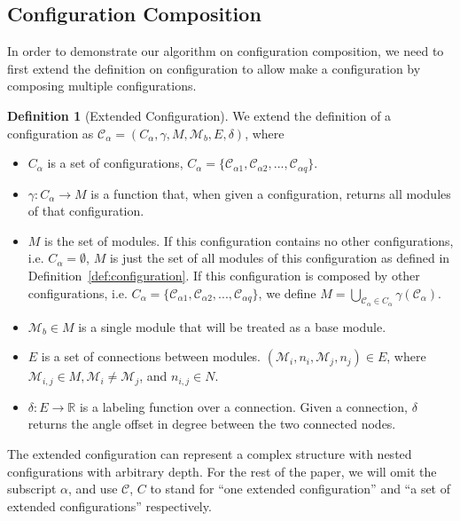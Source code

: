 \documentclass[conference]{IEEEtran}
\theoremstyle{definition}
\newtheorem{definition}{Definition}[section]
\begin{document}
\subsection{Configuration Composition} \label{sec:conf_composition}
In order to demonstrate our algorithm on configuration composition, we need to first extend the definition on configuration to allow make a configuration by composing multiple configurations.
\begin{definition}[Extended Configuration] 
We extend the definition of a configuration as $\mathcal{C}_\alpha=(C_\alpha, \gamma, M, \mathcal{M}_b, E, \delta)$, where
\begin{itemize}
\item $C_\alpha$ is a set of configurations, $C_\alpha=\{\mathcal{C}_{\alpha1}, \mathcal{C}_{\alpha2}, ..., \mathcal{C}_{\alpha q}\}$.
\item $\gamma: C_\alpha \rightarrow M$ is a function that, when given a configuration, returns all modules of that configuration.
\item $M$ is the set of modules. If this configuration contains no other configurations, i.e. $C_\alpha = \emptyset$, $M$ is just the set of all modules of this configuration as defined in Definition~\ref{def:configuration}. If this configuration is composed by other configurations, i.e. $C_\alpha=\{\mathcal{C}_{\alpha1}, \mathcal{C}_{\alpha2}, ..., \mathcal{C}_{\alpha q}\}$, we define $M=\bigcup_{\mathcal{C}_{\alpha}\in C_{\alpha}}{\gamma(\mathcal{C}_{\alpha})}$.
\item $\mathcal{M}_b\in M$ is a single module that will be treated as a base module.
\item $E$ is a set of connections between modules. $(\mathcal{M}_i, n_i, \mathcal{M}_j, n_j)\in E$, where $\mathcal{M}_{i,j} \in M, \mathcal{M}_i \neq \mathcal{M}_j$, and $n_{i,j}\in N$.
\item $\delta: E \rightarrow \mathbb{R}$ is a labeling function over a connection. Given a connection, $\delta$ returns the angle offset in degree between the two connected nodes.
\end{itemize}
\end{definition}
The extended configuration can represent a complex structure with nested configurations with arbitrary depth. For the rest of the paper, we will omit the subscript $\alpha$, and use $\mathcal{C}$, $C$ to stand for ``one extended configuration'' and ``a set of extended configurations'' respectively.
\end{document}
